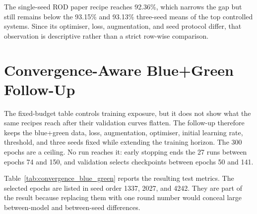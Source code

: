 The single-seed ROD paper recipe reaches 92.36\%, which narrows the gap but
still remains below the 93.15\% and 93.13\% three-seed means of the top
controlled systems. Since its optimiser, loss, augmentation, and seed protocol
differ, that observation is descriptive rather than a strict row-wise
comparison.

\section{Convergence-Aware Blue+Green Follow-Up}

The fixed-budget table controls training exposure, but it does not show what
the same recipes reach after their validation curves flatten. The follow-up
therefore keeps the blue+green data, loss, augmentation, optimiser, initial
learning rate, threshold, and three seeds fixed while extending the training
horizon. The 300 epochs are a ceiling. No run reaches it: early stopping ends
the 27 runs between epochs 74 and 150, and validation selects checkpoints
between epochs 50 and 141.

Table~\ref{tab:convergence_blue_green} reports the resulting test metrics. The
selected epochs are listed in seed order 1337, 2027, and 4242. They are part of
the result because replacing them with one round number would conceal large
between-model and between-seed differences.


